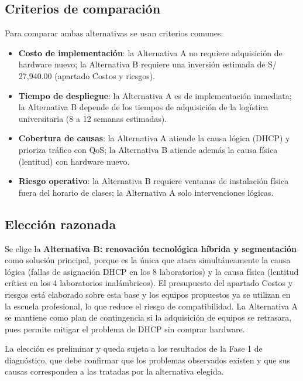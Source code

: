 \subsection{Criterios de comparación}

	Para comparar ambas alternativas se usan criterios comunes:

	\begin{itemize}
		\item \textbf{Costo de implementación}: la Alternativa A no requiere adquisición de hardware nuevo; la Alternativa B requiere una inversión estimada de S/ 27,940.00 (apartado Costos y riesgos).
		\item \textbf{Tiempo de despliegue}: la Alternativa A es de implementación inmediata; la Alternativa B depende de los tiempos de adquisición de la logística universitaria (8 a 12 semanas estimadas).
		\item \textbf{Cobertura de causas}: la Alternativa A atiende la causa lógica (DHCP) y prioriza tráfico con QoS; la Alternativa B atiende además la causa física (lentitud) con hardware nuevo.
		\item \textbf{Riesgo operativo}: la Alternativa B requiere ventanas de instalación física fuera del horario de clases; la Alternativa A solo intervenciones lógicas.
	\end{itemize}

\subsection{Elección razonada}

	Se elige la \textbf{Alternativa B: renovación tecnológica híbrida y segmentación} como solución principal, porque es la única que ataca simultáneamente la causa lógica (fallas de asignación DHCP en los 8 laboratorios) y la causa física (lentitud crítica en los 4 laboratorios inalámbricos). El presupuesto del apartado Costos y riesgos está elaborado sobre esta base y los equipos propuestos ya se utilizan en la escuela profesional, lo que reduce el riesgo de compatibilidad. La Alternativa A se mantiene como plan de contingencia si la adquisición de equipos se retrasara, pues permite mitigar el problema de DHCP sin comprar hardware.

	La elección es preliminar y queda sujeta a los resultados de la Fase 1 de diagnóstico, que debe confirmar que los problemas observados existen y que sus causas corresponden a las tratadas por la alternativa elegida.

